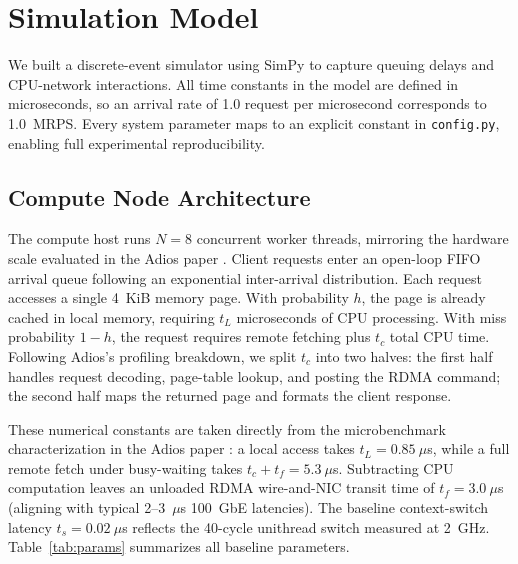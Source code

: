 \section{Simulation Model}
\label{sec:model}
We built a discrete-event simulator using SimPy \cite{simpy} to capture queuing delays and CPU-network interactions. All time constants in the model are defined in microseconds, so an arrival rate of 1.0 request per microsecond corresponds to 1.0~MRPS. Every system parameter maps to an explicit constant in \texttt{config.py}, enabling full experimental reproducibility.

\subsection{Compute Node Architecture}
The compute host runs $N = 8$ concurrent worker threads, mirroring the hardware scale evaluated in the Adios paper \cite{adios}. Client requests enter an open-loop FIFO arrival queue following an exponential inter-arrival distribution. Each request accesses a single 4~KiB memory page. With probability $h$, the page is already cached in local memory, requiring $t_L$ microseconds of CPU processing. With miss probability $1 - h$, the request requires remote fetching plus $t_c$ total CPU time. Following Adios's profiling breakdown, we split $t_c$ into two halves: the first half handles request decoding, page-table lookup, and posting the RDMA command; the second half maps the returned page and formats the client response.

These numerical constants are taken directly from the microbenchmark characterization in the Adios paper \cite{adios}: a local access takes $t_L = 0.85~\mu$s, while a full remote fetch under busy-waiting takes $t_c + t_f = 5.3~\mu$s. Subtracting CPU computation leaves an unloaded RDMA wire-and-NIC transit time of $t_f = 3.0~\mu$s (aligning with typical 2--3~$\mu$s 100~GbE latencies). The baseline context-switch latency $t_s = 0.02~\mu$s reflects the 40-cycle unithread switch measured at 2~GHz. Table~\ref{tab:params} summarizes all baseline parameters.

